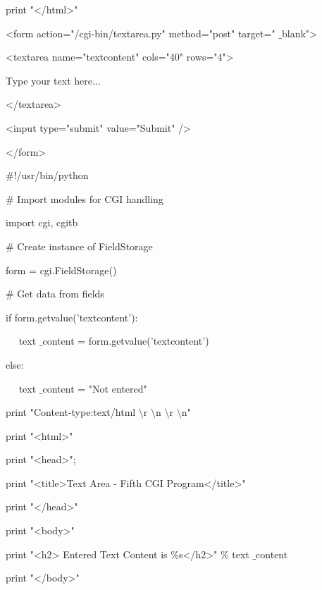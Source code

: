 \begin{12pt}
\begin{12pt}
\begin{12pt}
\begin{12pt}
\begin{12pt}
\begin{12pt}
\begin{12pt}
print "</html>" \par
\vspace{12pt}
\noindent 
<form action="/cgi-bin/textarea.py" method="post" target=" $  \_  $blank"> \par
\noindent 
<textarea name="textcontent" cols="40" rows="4"> \par
\noindent 
Type your text here... \par
\noindent 
</textarea> \par
\noindent 
<input type="submit" value="Submit" /> \par
\noindent 
</form> \par
\vspace{12pt}
\noindent 
 $  \#  $!/usr/bin/python \par
\vspace{12pt}
\noindent 
 $  \#  $ Import modules for CGI handling  \par
\noindent 
import cgi, cgitb  \par
\vspace{12pt}
\noindent 
 $  \#  $ Create instance of FieldStorage  \par
\noindent 
form = cgi.FieldStorage()  \par
\vspace{12pt}
\noindent 
 $  \#  $ Get data from fields \par
\noindent 
if form.getvalue('textcontent'): \par
\noindent 
~~ text $  \_  $content = form.getvalue('textcontent') \par
\noindent 
else: \par
\noindent 
~~ text $  \_  $content = "Not entered" \par
\vspace{12pt}
\noindent 
print "Content-type:text/html $  \setminus  $r $  \setminus  $n $  \setminus  $r $  \setminus  $n" \par
\noindent 
print "<html>" \par
\noindent 
print "<head>"; \par
\noindent 
print "<title>Text Area - Fifth CGI Program</title>" \par
\noindent 
print "</head>" \par
\noindent 
print "<body>" \par
\noindent 
print "<h2> Entered Text Content is  $  \%  $s</h2>"  $  \%  $ text $  \_  $content \par
\noindent 
print "</body>" \par
\vspace{12pt}

\end{12pt}
\end{12pt}
\end{12pt}
\end{12pt}
\end{12pt}
\end{12pt}
\end{12pt}
